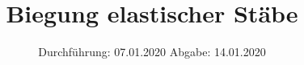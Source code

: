 

\subject{V103}
\title{Biegung elastischer Stäbe}
\date{%
  Durchführung: 07.01.2020
  \hspace{3em}
  Abgabe: 14.01.2020
}



\maketitle
\thispagestyle{empty}
\tableofcontents
\newpage








\printbibliography{}



